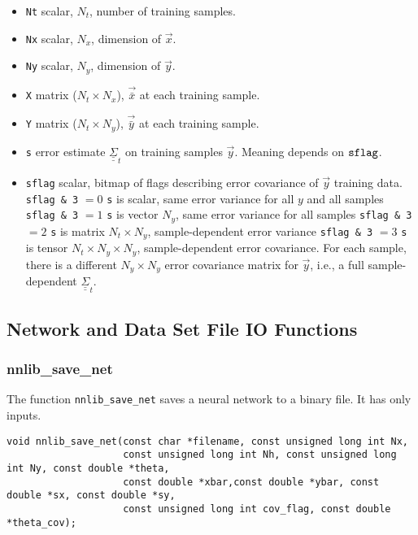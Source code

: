 \documentclass{article}    %
\newcommand{\dbul}[1]{\underline{\underline{#1}}}
\begin{document}
\begin{itemize}
\item \verb|Nt| scalar, $N_t$, number of training samples.
\item \verb|Nx| scalar, $N_x$, dimension of $\vec{x}$.
\item \verb|Ny| scalar, $N_y$, dimension of $\vec{y}$.
\item \verb|X| matrix ($N_t \times N_x$), $\vec{\bar{x}}$ at each training sample.
\item \verb|Y| matrix ($N_t \times N_y$), $\vec{\bar{y}}$ at each training sample.
\item \verb|s| error estimate $\dbul{\Sigma}_t$ on training samples $\vec{y}$. Meaning depends on $\verb|sflag|$.
\item \verb|sflag| scalar, bitmap of flags describing error covariance of $\vec{y}$ training data.
  \subitem \verb|sflag & 3| $=0$ \verb|s| is scalar, same error variance for all $y$ and all samples
  \subitem \verb|sflag & 3| $=1$ \verb|s| is vector $N_y$, same error variance for all samples
  \subitem \verb|sflag & 3| $=2$ \verb|s| is matrix $N_t \times N_y$, sample-dependent error variance
  \subitem \verb|sflag & 3| $=3$ \verb|s| is tensor $N_t \times N_y
  \times N_y$, sample-dependent error covariance. For each sample,
  there is a different $N_y \times N_y$ error covariance matrix for
  $\vec{y}$, i.e., a full sample-dependent $\dbul{\Sigma}_t$.
\end{itemize}

\subsection{Network and Data Set File IO Functions}

\subsubsection{nnlib\_save\_net}

The function \verb|nnlib_save_net| saves a neural network to a binary
file. It has only inputs.

\begin{verbatim}
void nnlib_save_net(const char *filename, const unsigned long int Nx, 
                    const unsigned long int Nh, const unsigned long int Ny, const double *theta, 
                    const double *xbar,const double *ybar, const double *sx, const double *sy,
                    const unsigned long int cov_flag, const double *theta_cov);
\end{verbatim}
\end{document}
